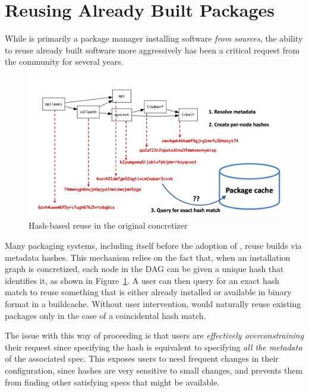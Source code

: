 \section{Reusing Already Built Packages}
\label{sec:reuse}

While \spack{} is primarily a package manager installing software \emph{from sources}, the ability to reuse already built software more aggressively has been a critical request from the community for several years.

\begin{figure}[htb]
  \includegraphics[width=\columnwidth]{figures/hash-cache.pdf}
  \caption{Hash-based reuse in the original \spack concretizer}
  \label{fig:hash_reuse}
\end{figure}

Many packaging systems, including \spack{} itself before the adoption of \clingo, reuse builds via metadata hashes. This mechanism relies on the fact that, when an installation graph is concretized, each node in the DAG can be given a unique hash that identifies it, as shown in Figure~\ref{fig:hash_reuse}. A user can then query for an exact hash match to reuse something that is either already installed or available in binary format in a buildcache. Without user intervention, \spack{} would naturally reuse existing packages only in the case of a coincidental hash match.

The issue with this way of proceeding is that users are \emph{effectively overconstraining} their request since specifying the hash is equivalent to specifying \emph{all the metadata} of the associated spec. This exposes users to need frequent changes in their configuration, since hashes are very sensitive to small changes, and prevents them from finding other satisfying specs that might be available.

